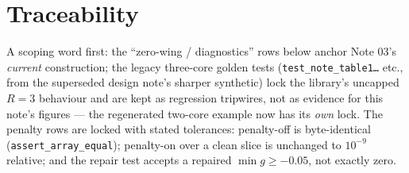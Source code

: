 \documentclass[11pt]{article}
\begin{document}
\section{Traceability}
\label{sec:traceability}

A scoping word first: the ``zero-wing / diagnostics'' rows below anchor
Note 03's \emph{current} construction; the legacy three-core golden tests
(\texttt{test\_note\_table1\ldots} etc., from the superseded design note's
sharper synthetic) lock the library's uncapped $R=3$ behaviour and are kept as
regression tripwires, not as evidence for this note's figures --- the
regenerated two-core example now has its \emph{own} lock. The penalty rows
are locked with stated tolerances: penalty-off is byte-identical
(\texttt{assert\_array\_equal}); penalty-on over a clean slice is unchanged
to $10^{-9}$ relative; and the repair test accepts a repaired
$\min g\ge-0.05$, not exactly zero.
\end{document}
